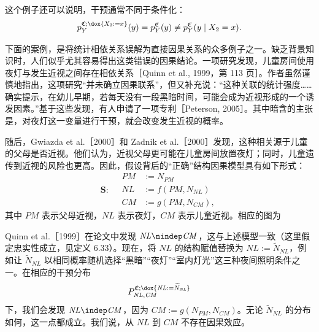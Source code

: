 这个例子还可以说明，干预通常不同于条件化：
\[
 p_Y^{\mathfrak C;\dox{X_2:=x}}(y)
 =p_Y^{\mathfrak C}(y)\ne p_Y^{\mathfrak C}(y\mid X_2=x).
\]

\begin{example}[近视]
下面的案例，是将统计相依关系误解为直接因果关系的众多例子之一。缺乏背景知识时，人们似乎尤其容易得出这类错误的因果结论。一项研究发现，儿童房间使用夜灯与发生近视之间存在相依关系［Quinn et al., 1999，第 113 页］。作者虽然谨慎地指出，这项研究“并未确立因果联系”，但又补充说：“这种关联的统计强度……确实提示，在幼儿早期，若每天没有一段黑暗时间，可能会成为近视形成的一个诱发因素。”基于这些发现，有人申请了一项专利［Peterson, 2005］。其中暗含的主张是，对夜灯这一变量进行干预，就会改变发生近视的概率。

随后，Gwiazda et al.［2000］和 Zadnik et al.［2000］发现，这种相关源于儿童的父母是否近视。他们认为，近视父母更可能在儿童房间放置夜灯；同时，儿童遗传到近视的风险也更高。因此，假设背后的“正确”结构因果模型具有如下形式：
\[
 \mathbf S:\quad
 \begin{aligned}
 \mathit{PM}&:=N_{\mathit{PM}}\\
 \mathit{NL}&:=f(\mathit{PM},N_{\mathit{NL}})\\
 \mathit{CM}&:=g(\mathit{PM},N_{\mathit{CM}}),
 \end{aligned}
\]
其中 $\mathit{PM}$ 表示父母近视，$\mathit{NL}$ 表示夜灯，$\mathit{CM}$ 表示儿童近视。相应的图为
\begin{center}
\end{center}
Quinn et al.［1999］在论文中发现 $\mathit{NL}\nindep\mathit{CM}$，这与上述模型一致（这里假定忠实性成立，见定义 6.33）。现在，将 $\mathit{NL}$ 的结构赋值替换为 $\mathit{NL}:=\widetilde N_{\mathit{NL}}$，例如让 $\widetilde N_{\mathit{NL}}$ 以相同概率随机选择“黑暗”“夜灯”“室内灯光”这三种夜间照明条件之一。在相应的干预分布
\[
 P_{\mathit{NL},\mathit{CM}}^{\mathfrak C;\dox{\mathit{NL}:=\widetilde N_{\mathit{NL}}}}
\]
下，我们会发现 $\mathit{NL}\indep\mathit{CM}$，因为 $\mathit{CM}:=g(N_{\mathit{PM}},N_{\mathit{CM}})$。无论 $\widetilde N_{\mathit{NL}}$ 的分布如何，这一点都成立。我们说，从 $\mathit{NL}$ 到 $\mathit{CM}$ 不存在因果效应。
\end{example}

